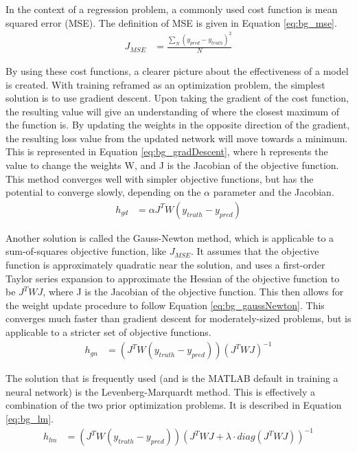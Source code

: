\documentclass[11pt]{report}
\begin{document}
	\par In the context of a regression problem, a commonly used cost function is mean squared error (MSE). The definition of MSE is given in Equation \ref{eq:bg_mse}. 
	\begin{align}
		J_{MSE} &= \frac{\sum_N (y_{pred}-y_{truth})^2}{N} \label{eq:bg_mse}
	\end{align}
	\par By using these cost functions, a clearer picture about the effectiveness of a model is created. With training reframed as an optimization problem, the simplest solution is to use gradient descent. Upon taking the gradient of the cost function, the resulting value will give an understanding of where the closest maximum of the function is. By updating the weights in the opposite direction of the gradient, the resulting loss value from the updated network will move towards a minimum. This is represented in Equation \ref{eq:bg_gradDescent}, where h represents the value to change the weights W, and J is the Jacobian of the objective function. This method converges well with simpler objective functions, but has the potential to converge slowly, depending on the $\alpha$ parameter and the Jacobian.
	\begin{align}
		h_{gd} &= \alpha J^T W(y_{truth}-y_{pred}) \label{eq:bg_gradDescent}
	\end{align}
	\par Another solution is called the Gauss-Newton method, which is applicable to a sum-of-squares objective function, like $J_{MSE}$. It assumes that the objective function is approximately quadratic near the solution, and uses a first-order Taylor series expansion to approximate the Hessian of the objective function to be $J^TWJ$, where J is the Jacobian of the objective function. This then allows for the weight update procedure to follow Equation \ref{eq:bg_gaussNewton}. This converges much faster than gradient descent for moderately-sized problems, but is applicable to a stricter set of objective functions.
	\begin{align}
		h_{gn} &= (J^TW(y_{truth}-y_{pred}))(J^T WJ)^{-1} \label{eq:bg_gaussNewton}
	\end{align}
	\par The solution that is frequently used (and is the MATLAB default in training a neural network) is the Levenberg-Marquardt method. This is effectively a combination of the two prior optimization problems. It is described in Equation \ref{eq:bg_lm}. 
	\begin{align}
		h_{lm} &= (J^TW(y_{truth}-y_{pred}))(J^T WJ + \lambda \cdot diag(J^T WJ))^{-1} \label{eq:bg_lm}
	\end{align}
\end{document}
